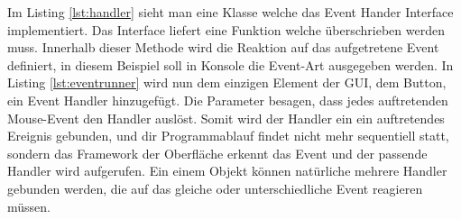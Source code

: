 

Im Listing \ref{lst:handler} sieht man eine Klasse welche das Event Hander Interface implementiert. Das Interface liefert eine Funktion welche überschrieben werden muss. Innerhalb dieser Methode wird die Reaktion auf das aufgetretene Event definiert, in diesem Beispiel soll in Konsole die Event-Art ausgegeben werden. In Listing \ref{lst:eventrunner} wird nun dem einzigen Element der GUI, dem Button, ein Event Handler hinzugefügt. Die Parameter besagen, dass jedes auftretenden Mouse-Event den Handler auslöst. Somit wird der Handler ein ein auftretendes Ereignis gebunden, und dir Programmablauf findet nicht mehr sequentiell statt, sondern das Framework der Oberfläche erkennt das Event und der passende Handler wird aufgerufen. Ein einem Objekt können natürliche mehrere Handler gebunden werden, die auf das gleiche oder unterschiedliche Event reagieren müssen.



